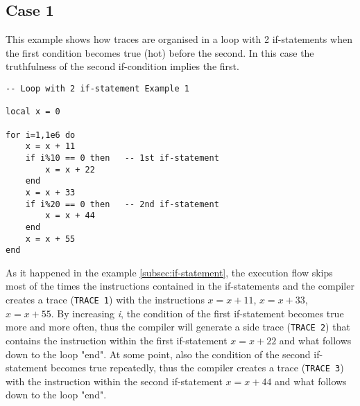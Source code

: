 \subsection{Case 1}
\label{2-if-example1}
This example shows how traces are organised in a loop with 2 if-statements when the first condition becomes true (hot) before the second. In this case the truthfulness of the second if-condition implies the first.
\begin{mdframed}[style=LuaStyleFrame]
\begin{lstlisting}[style=LuaStyle]
-- Loop with 2 if-statement Example 1

local x = 0

for i=1,1e6 do
	x = x + 11
	if i%10 == 0 then   -- 1st if-statement
		x = x + 22
	end
	x = x + 33
	if i%20 == 0 then   -- 2nd if-statement
		x = x + 44
	end
	x = x + 55
end
\end{lstlisting}
\end{mdframed}
As it happened in the example \ref{subsec:if-statement}, the execution flow skips most of the times the instructions contained in the if-statements and the compiler creates a trace (\texttt{TRACE 1}) with the instructions $x=x+11$, $x=x+33$, $x=x+55$. By increasing \textit{i}, the condition of the first if-statement becomes true more and more often, thus the compiler will generate a side trace (\texttt{TRACE 2}) that contains the instruction within the first if-statement $x=x+22$ and what follows down to the loop "end". At some point, also the condition of the second if-statement becomes true repeatedly, thus the compiler creates a trace (\texttt{TRACE 3}) with the instruction within the second if-statement $x=x+44$ and what follows down to the loop "end".
\begin{comment}
The side exit that corresponds to the first if-statement is taken more often than the second. Thus, the first side trace to be generated (TRACE 2) refers to the first if-statement. Then, when the side exit that corresponds to the second side trace is taken enough times, another side trace will be created (TRACE 3). It should be noted that in this case TRACE 3 is a side trace of TRACE 2, while TRACE 2 is a side trace of TRACE 1.
The code above generates the following bytecode dump. TRACE 1 contains all the instructions, but the ones inside the if-statements (lines 7 and 11); TRACE 2 the instructions inside the first if-statement and what follows; TRACE 3 the instructions inside the second if-statement and what follows.
\end{comment}

